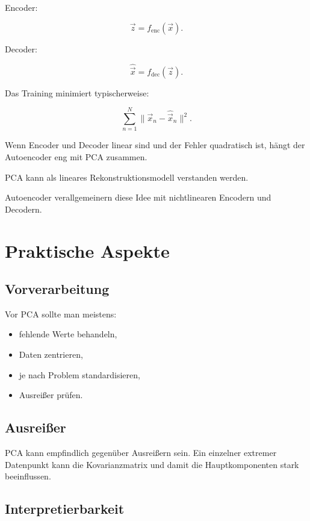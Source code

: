 Encoder:

\[
    \vec{z}
    =
    f_{\mathrm{enc}}(\vec{x}).
\]

Decoder:

\[
    \hat{\vec{x}}
    =
    f_{\mathrm{dec}}(\vec{z}).
\]

Das Training minimiert typischerweise:

\[
    \sum_{n=1}^{N}
    \|\vec{x}_n-\hat{\vec{x}}_n\|^2.
\]

Wenn Encoder und Decoder linear sind und der Fehler quadratisch ist, hängt der Autoencoder eng mit PCA zusammen.

\begin{conceptbox}
PCA kann als lineares Rekonstruktionsmodell verstanden werden.

Autoencoder verallgemeinern diese Idee mit nichtlinearen Encodern und Decodern.
\end{conceptbox}

\section{Praktische Aspekte}

\subsection{Vorverarbeitung}

Vor PCA sollte man meistens:

\begin{itemize}
    \item fehlende Werte behandeln,
    \item Daten zentrieren,
    \item je nach Problem standardisieren,
    \item Ausreißer prüfen.
\end{itemize}

\subsection{Ausreißer}

PCA kann empfindlich gegenüber Ausreißern sein.
Ein einzelner extremer Datenpunkt kann die Kovarianzmatrix und damit die Hauptkomponenten stark beeinflussen.

\subsection{Interpretierbarkeit}

